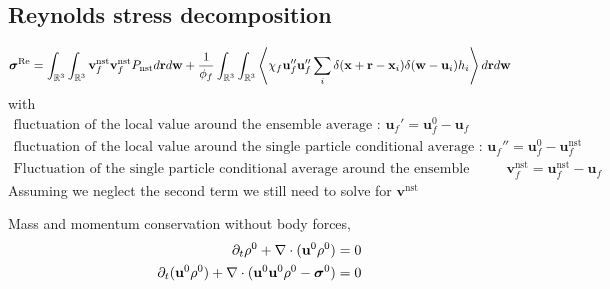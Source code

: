 \documentclass[11pt]{My_preprint}
\begin{document}
\subsection{Reynolds stress decomposition}
\begin{equation}
    \bm\sigma^\text{Re}
    = 
    \int_{\mathbb{R}^3}
    \int_{\mathbb{R}^3}
    \textbf{v}_f^\text{nst}
    \textbf{v}_f^\text{nst}
    P_\text{nst}
    d\textbf{r}
    d\textbf{w}
    + 
    \frac{1}{\phi_f}
    \int_{\mathbb{R}^3}
    \int_{\mathbb{R}^3}
    \left<
        \chi_f
        \textbf{u}_f''
        \textbf{u}_f''
        \sum_i 
        \delta(\textbf{x}+\textbf{r}-\textbf{x}_i)
        \delta(\textbf{w}-\textbf{u}_i)
        h_i
    \right>
    d\textbf{r}
    d\textbf{w}
\end{equation}
with 
\begin{align*}
    \text{fluctuation of the local value around the ensemble average : }\textbf{u}_f' = \textbf{u}_f^0 - \textbf{u}_f\\
    \text{fluctuation of the local value around the single particle conditional average : }\textbf{u}_f'' = \textbf{u}_f^0 - \textbf{u}_f^\text{nst}\\
    \text{Fluctuation of the single particle conditional average around the ensemble average : }\textbf{v}_f^\text{nst} = \textbf{u}_f^\text{nst} - \textbf{u}_f
\end{align*}
Assuming we neglect the second term we still need to solve for $\textbf{v}^\text{nst}$



Mass and momentum conservation without body forces, 
\begin{align*}
    \partial_t \rho^0 + \mathbf{\nabla}\cdot(\textbf{u}^0 \rho^0 ) = 0 \\
    \partial_t (\textbf{u}^0 \rho^0) + \mathbf{\nabla}\cdot(\textbf{u}^0 \textbf{u}^0 \rho^0 - \bm\sigma^0) = 0 \\
\end{align*}
\end{document}
